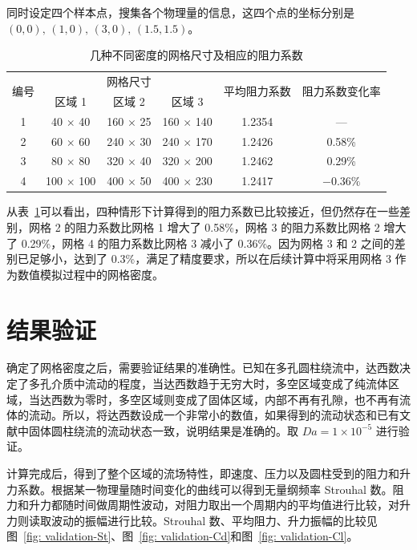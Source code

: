 同时设定四个样本点，搜集各个物理量的信息，这四个点的坐标分别是 $(0,0),\,(1,0),\,(3,0),\,(1.5,1.5)$。

\begin{table}
	\caption{几种不同密度的网格尺寸及相应的阻力系数}\label{tab: grid}
	\vspace{.5em}\centering\wuhao
	\begin{tabular}{cccccc}
		\toprule[1.5pt]
		\multirow{2}[3]{*}{编号} & \multicolumn{3}{c}{网格尺寸} & \multirow{2}[3]{*}{平均阻力系数} & \multirow{2}[3]{*}{阻力系数变化率} \\
		\cmidrule[.67pt](lr){2-4}
		& 区域 1 & 区域 2 & 区域 3 & & \\
		\midrule[1pt]
		1 & 40 $\times$ 40 & 160 $\times$ 25 & 160 $\times$ 140 & 1.2354 & — \\
		2 & 60 $\times$ 60 & 240 $\times$ 30 & 240 $\times$ 170 & 1.2426 & 0.58\% \\
		3 & 80 $\times$ 80 & 320 $\times$ 40 & 320 $\times$ 200 & 1.2462 & 0.29\% \\
		4 & 100 $\times$ 100 & 400 $\times$ 50 & 400 $\times$ 230 & 1.2417 & $-0.36\%$ \\
		\bottomrule[1.5pt]
	\end{tabular}
\end{table}

从表~\ref{tab: grid}可以看出，四种情形下计算得到的阻力系数已比较接近，但仍然存在一些差别，网格 2 的阻力系数比网格 1 增大了 0.58\%，网格 3 的阻力系数比网格 2 增大了 0.29\%，网格 4 的阻力系数比网格 3 减小了 0.36\%。因为网格 3 和 2 之间的差别已足够小，达到了 0.3\%，满足了精度要求，所以在后续计算中将采用网格 3 作为数值模拟过程中的网格密度。

\section{结果验证}\label{sec: validation}

确定了网格密度之后，需要验证结果的准确性。已知在多孔圆柱绕流中，达西数决定了多孔介质中流动的程度，当达西数趋于无穷大时，多空区域变成了纯流体区域，当达西数为零时，多空区域则变成了固体区域，内部不再有孔隙，也不再有流体的流动。所以，将达西数设成一个非常小的数值，如果得到的流动状态和已有文献中固体圆柱绕流的流动状态一致，说明结果是准确的。取 $Da=1\times 10^{-5}$ 进行验证。

计算完成后，得到了整个区域的流场特性，即速度、压力以及圆柱受到的阻力和升力系数。根据某一物理量随时间变化的曲线可以得到无量纲频率 Strouhal 数。阻力和升力都随时间做周期性波动，对阻力取出一个周期内的平均值进行比较，对升力则读取波动的振幅进行比较。Strouhal 数、平均阻力、升力振幅的比较见图~\ref{fig: validation-St}、图~\ref{fig: validation-Cd}和图~\ref{fig: validation-Cl}。


